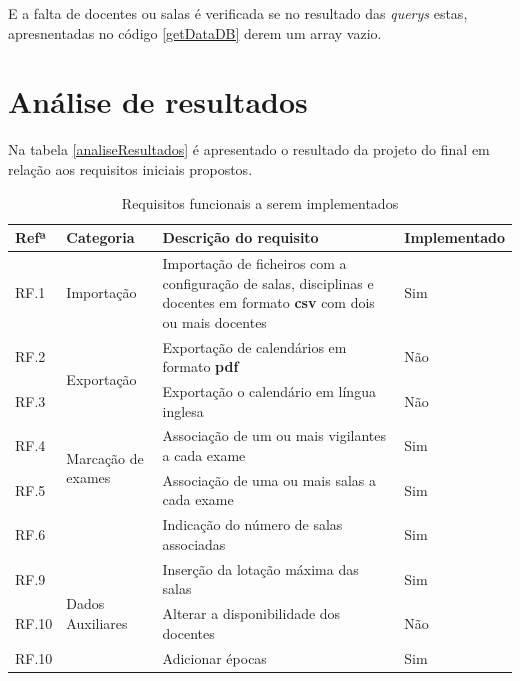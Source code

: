 \documentclass[12pt, twoside]{report}
\begin{document}
	E a falta de docentes ou salas é verificada se no resultado das \textit{querys} estas, apresnentadas no código \ref{getDataDB} derem um array vazio.
	
	
	\chapter{Análise de resultados}

	Na tabela \ref{analiseResultados} é apresentado o resultado da projeto do final em relação aos requisitos iniciais propostos.
	
	\def\arraystretch{1.5}
	\begin{center}
		\label{analiseResultados}
		\begin{longtable}{|m{1cm}|m{2.2cm}|m{9cm}|m{3cm}|}
			\caption{Requisitos funcionais a serem implementados}\\
			
			\hline			
			\textbf{Refª }	& \textbf{Categoria}&\textbf{Descrição do requisito} & \textbf{Implementado} \\
			\hline
			
			
			RF.1 &Importação& Importação de ficheiros com a configuração de salas, disciplinas e docentes em formato \textbf{csv} com dois ou mais docentes& Sim \\
			\hline
			
			RF.2 &\multirow{2}{2cm}{Exportação}& Exportação de calendários em formato \textbf{pdf} & Não \\
			
			RF.3 && Exportação o calendário em língua inglesa & Não \\
			\hline
			
			RF.4 &\multirow{2}{2cm}{Marcação de exames}& Associação de um ou mais vigilantes a cada exame & Sim\\
			
			RF.5 &&	Associação de uma ou mais salas a cada exame & Sim\\
			
			RF.6 &&Indicação do número de salas associadas & Sim\\
			\hline
			
			RF.9 &\multirow{6}{2cm}{Dados Auxiliares}& Inserção da lotação máxima das salas& Sim \\
			
			RF.10 && Alterar a disponibilidade dos docentes & Não\\
			
			RF.10 && Adicionar épocas & Sim\\
			

\end{longtable}
\end{center}
\end{document}
